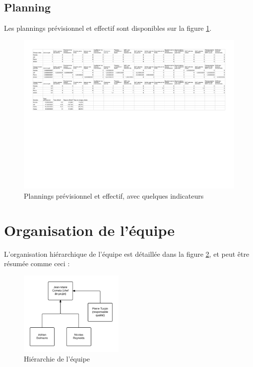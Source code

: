 \subsection{Planning}

Les plannings prévisionnel et effectif sont disponibles sur la figure
\ref{fig:plannings}.

\begin{landscape}
 \begin{figure}[ht]
    \centering
    \includegraphics[width=0.7\paperheight]{plannings}
    \caption{Plannings prévisionnel et effectif, avec quelques indicateurs}
    \label{fig:plannings}
    \end{figure}
 \end{landscape}

\section{Organisation de l'équipe}

L'organisation hiérarchique de l'équipe est détaillée dans la figure
\ref{fig:hierarchie}, et peut être résumée comme ceci :

\begin{figure}
    \centering
    \includegraphics[width=0.45\textwidth]{hierarchie}
    \caption{Hiérarchie de l'équipe}
    \label{fig:hierarchie}
\end{figure}


